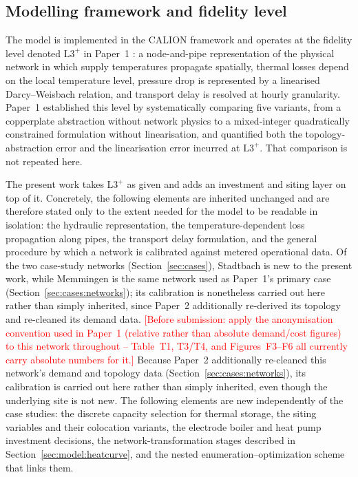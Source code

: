 \documentclass[review,3p]{elsarticle}
\newcommand{\placeholder}[1]{\textcolor{red}{[#1]}}
\newcommand{\Lplus}{\mathrm{L3}^{+}}
\begin{document}
\subsection{Modelling framework and fidelity level}
\label{sec:model:framework}

The model is implemented in the CALION framework and operates at the
fidelity level denoted $\Lplus$ in Paper~1 \cite{Ruess.2026}: a
node-and-pipe representation of the physical network in which supply
temperatures propagate spatially, thermal losses depend on the local
temperature level, pressure drop is represented by a linearised
Darcy--Weisbach relation, and transport delay is resolved at hourly
granularity. Paper~1 established this level by systematically comparing
five variants, from a copperplate abstraction without network physics to
a mixed-integer quadratically constrained formulation without
linearisation, and quantified both the topology-abstraction error and
the linearisation error incurred at $\Lplus$. That comparison is not
repeated here.

The present work takes $\Lplus$ as given and adds an investment and
siting layer on top of it. Concretely, the following elements are
inherited unchanged and are therefore stated only to the extent needed
for the model to be readable in isolation: the hydraulic representation,
the temperature-dependent loss propagation along pipes, the transport
delay formulation, and the general procedure by which a network is
calibrated against metered operational data. Of the two case-study
networks (Section~\ref{sec:cases}), Stadtbach is new to the
present work, while Memmingen is the same network used
as Paper~1's primary case (Section~\ref{sec:cases:networks}); its
calibration is nonetheless carried out here rather than simply
inherited, since Paper~2 additionally re-derived its topology and
re-cleaned its demand data.
\placeholder{Before submission: apply the anonymisation convention used
in Paper~1 (relative rather than absolute demand/cost figures) to this
network throughout -- Table~T1, T3/T4, and Figures~F3--F6 all currently
carry absolute numbers for it.}
Because Paper~2 additionally re-cleaned this network's demand and
topology data (Section~\ref{sec:cases:networks}), its calibration is
carried out here rather than simply inherited, even though the
underlying site is not new. The
following elements are new independently of the case studies: the
discrete capacity selection for thermal storage, the siting variables
and their colocation variants, the electrode boiler and heat pump
investment decisions, the network-transformation stages described in
Section~\ref{sec:model:heatcurve}, and the nested
enumeration--optimization scheme that links them.
\end{document}
